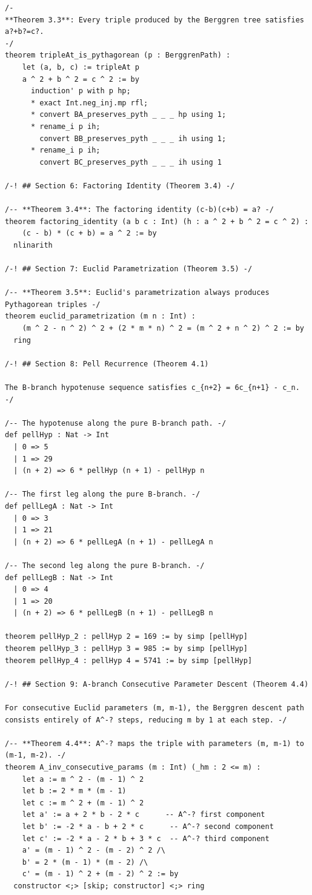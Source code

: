 \documentclass[11pt,twoside,openright]{book}
\theoremstyle{definition}
\theoremstyle{remark}
\begin{document}
\begin{lstlisting}[style=lean]
/-
**Theorem 3.3**: Every triple produced by the Berggren tree satisfies a?+b?=c?.
-/
theorem tripleAt_is_pythagorean (p : BerggrenPath) :
    let (a, b, c) := tripleAt p
    a ^ 2 + b ^ 2 = c ^ 2 := by
      induction' p with p hp;
      * exact Int.neg_inj.mp rfl;
      * convert BA_preserves_pyth _ _ _ hp using 1;
      * rename_i p ih;
        convert BB_preserves_pyth _ _ _ ih using 1;
      * rename_i p ih;
        convert BC_preserves_pyth _ _ _ ih using 1

/-! ## Section 6: Factoring Identity (Theorem 3.4) -/

/-- **Theorem 3.4**: The factoring identity (c-b)(c+b) = a? -/
theorem factoring_identity (a b c : Int) (h : a ^ 2 + b ^ 2 = c ^ 2) :
    (c - b) * (c + b) = a ^ 2 := by
  nlinarith

/-! ## Section 7: Euclid Parametrization (Theorem 3.5) -/

/-- **Theorem 3.5**: Euclid's parametrization always produces Pythagorean triples -/
theorem euclid_parametrization (m n : Int) :
    (m ^ 2 - n ^ 2) ^ 2 + (2 * m * n) ^ 2 = (m ^ 2 + n ^ 2) ^ 2 := by
  ring

/-! ## Section 8: Pell Recurrence (Theorem 4.1)

The B-branch hypotenuse sequence satisfies c_{n+2} = 6c_{n+1} - c_n. -/

/-- The hypotenuse along the pure B-branch path. -/
def pellHyp : Nat -> Int
  | 0 => 5
  | 1 => 29
  | (n + 2) => 6 * pellHyp (n + 1) - pellHyp n

/-- The first leg along the pure B-branch. -/
def pellLegA : Nat -> Int
  | 0 => 3
  | 1 => 21
  | (n + 2) => 6 * pellLegA (n + 1) - pellLegA n

/-- The second leg along the pure B-branch. -/
def pellLegB : Nat -> Int
  | 0 => 4
  | 1 => 20
  | (n + 2) => 6 * pellLegB (n + 1) - pellLegB n

theorem pellHyp_2 : pellHyp 2 = 169 := by simp [pellHyp]
theorem pellHyp_3 : pellHyp 3 = 985 := by simp [pellHyp]
theorem pellHyp_4 : pellHyp 4 = 5741 := by simp [pellHyp]

/-! ## Section 9: A-branch Consecutive Parameter Descent (Theorem 4.4)

For consecutive Euclid parameters (m, m-1), the Berggren descent path
consists entirely of A^-? steps, reducing m by 1 at each step. -/

/-- **Theorem 4.4**: A^-? maps the triple with parameters (m, m-1) to (m-1, m-2). -/
theorem A_inv_consecutive_params (m : Int) (_hm : 2 <= m) :
    let a := m ^ 2 - (m - 1) ^ 2
    let b := 2 * m * (m - 1)
    let c := m ^ 2 + (m - 1) ^ 2
    let a' := a + 2 * b - 2 * c      -- A^-? first component
    let b' := -2 * a - b + 2 * c      -- A^-? second component
    let c' := -2 * a - 2 * b + 3 * c  -- A^-? third component
    a' = (m - 1) ^ 2 - (m - 2) ^ 2 /\
    b' = 2 * (m - 1) * (m - 2) /\
    c' = (m - 1) ^ 2 + (m - 2) ^ 2 := by
  constructor <;> [skip; constructor] <;> ring


\end{lstlisting}
\end{document}
